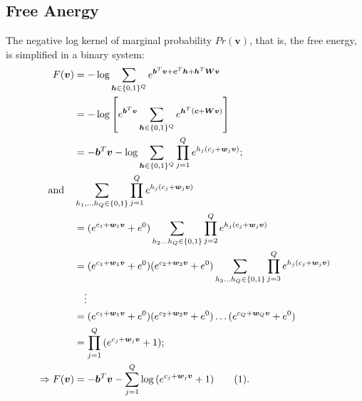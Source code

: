 \documentclass[11pt]{article}
\newcommand\numberthis{\addtocounter{equation}{1}\tag{\theequation}}
\newcommand{\vb}{\boldsymbol{b}}
\newcommand{\vc}{\boldsymbol{c}}
\newcommand{\vh}{\boldsymbol{h}}
\newcommand{\vv}{\boldsymbol{v}}
\newcommand{\vw}{\boldsymbol{w}}
\newcommand{\mw}{\boldsymbol{W}}
\begin{document}
{\subsection{Free Anergy}
The negative log kernel of marginal probability $Pr(\vv)$, that is, the free energy, is simplified in a binary system:
\begin{align*}
  F(\vv) &= -\log{\sum_{\vh\in \{0,1\}^Q}{e^{\vb^T \vv + \vc^T \vh + \vh^T \mw \vv}}} \\
         &= -\log{\left[ e^{\vb^T\vv}\sum_{\vh\in \{0,1\}^Q}{e^{\vh^T(\vc + \mw \vv)}} \right]} \\
         &= -\vb^T\vv - \log{\sum_{\vh\in \{0,1\}^Q}{ \prod_{j=1}^Q{e^{h_j(c_j + \vw_j\vv)}} }}; \\
  \textrm{and} \quad & \sum_{h_1, \dots h_Q \in \{0,1\}}{\prod_{j=1}^Q{e^{h_j(c_j + \vw_j\vv)}}} \\
         &= (e^{c_1+\vw_1\vv}+e^{0}) \sum_{h_2 \dots h_Q \in\{0,1\}}{ \prod_{j=2}^Q{e^{h_j(c_j + \vw_j\vv)}} } \\
         &= (e^{c_1+\vw_1\vv}+e^{0})(e^{c_2+\vw_2\vv}+e^{0}) \sum_{h_3 \dots h_Q \in\{0,1\}}{ \prod_{j=3}^Q{e^{h_j(c_j + \vw_j\vv)}} } \\
         & \quad \vdots \\
         &= (e^{c_1+\vw_1\vv}+e^{0})(e^{c_2+\vw_2\vv}+e^{0}) \dots (e^{c_Q+\vw_Q\vv}+e^{0}) \\
         &= \prod_{j=1}^Q{(e^{c_j+\vw_j\vv} + 1)}; \\
  \Rightarrow
  F(\vv) &= -\vb^T\vv - \sum_{j=1}^Q{\log{(e^{c_j+\vw_j\vv} + 1)}} \numberthis \label{eq:fe_bin}.
\end{align*}
}
\end{document}
